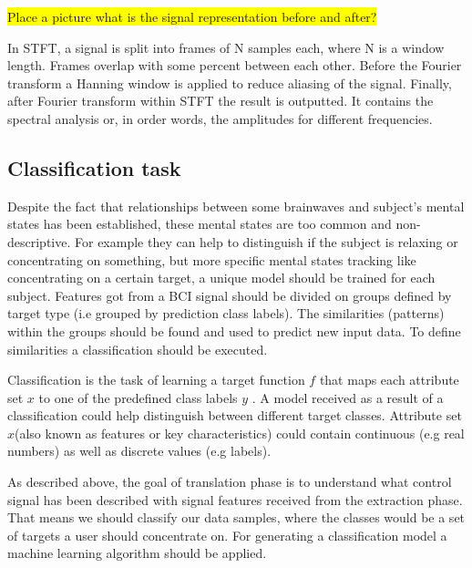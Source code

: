 \documentclass[12pt]{article}
\theoremstyle{definition}
\begin{document}
\colorbox{yellow}{Place a picture what is the signal representation before and after?}

In STFT, a signal is split into frames of N samples each, where N is a window length. Frames overlap with some percent between each other. Before the Fourier transform a Hanning window is applied to reduce aliasing of the signal. Finally, after Fourier transform within STFT the result is outputted. It contains the spectral analysis or, in order words, the amplitudes for different frequencies.

\subsection{Classification task}

Despite the fact that relationships between some brainwaves and subject's mental states has been established, these mental states are too common and non-descriptive. For example they can help to distinguish if the subject is relaxing or concentrating on something, but more specific mental states tracking like concentrating on a certain target, a unique model should be trained for each subject. Features got from a BCI signal should be divided on groups defined by target type (i.e grouped by prediction class labels). The similarities (patterns) within the groups should be found and used to predict new input data. To define similarities a classification should be executed.

Classification is the task of learning a target function $f$ that maps each attribute set $x$ to one of the predefined class labels $y$ \cite{classification_basics}. A model received as a result of a classification could help distinguish between different target classes. Attribute set $x$(also known as features or key characteristics) could contain continuous (e.g real numbers) as well as discrete values (e.g labels).

As described above, the goal of translation phase is to understand what control signal has been described with signal features received from the extraction phase. That means we should classify our data samples, where the classes would be a set of targets a user should concentrate on. For generating a classification model a machine learning algorithm should be applied. 
\end{document}
